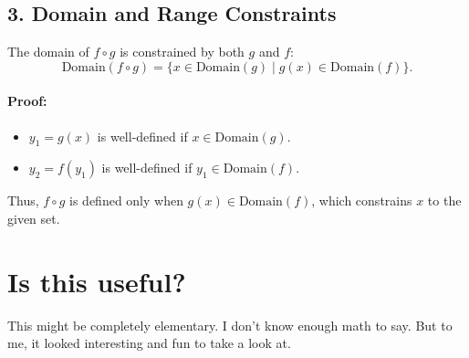 \documentclass{article}
\begin{document}
\subsection*{3. Domain and Range Constraints}
The domain of \( f \circ g \) is constrained by both \( g \) and \( f \):
\[
\text{Domain}(f \circ g) = \{ x \in \text{Domain}(g) \mid g(x) \in \text{Domain}(f) \}.
\]

\paragraph{Proof:}
\begin{itemize}
    \item \( y_1 = g(x) \) is well-defined if \( x \in \text{Domain}(g) \).
    \item \( y_2 = f(y_1) \) is well-defined if \( y_1 \in \text{Domain}(f) \).
\end{itemize}
Thus, \( f \circ g \) is defined only when \( g(x) \in \text{Domain}(f) \), which constrains \( x \) to the given set.

\section{Is this useful?}

This might be completely elementary. I don't know enough math to say. But to me, it looked interesting and fun to take a look at.
\end{document}
